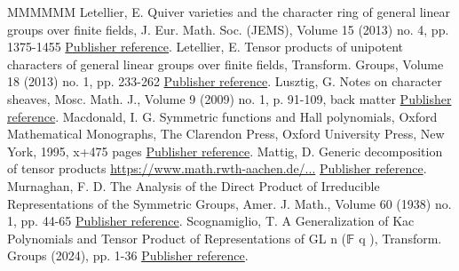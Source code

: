 \documentclass[11pt]{article}
\theoremstyle{definition}
\numberwithin{equation}{section}
\begin{document}
\begin{thebibliography}{MMMMMM}
 Letellier, E. Quiver varieties and the character ring of general linear groups over finite fields, J. Eur. Math. Soc. (JEMS), Volume 15 (2013) no. 4, pp. 1375-1455 \href{https://alco.centre-mersenne.org/articles/10.5802/alco.434/#L2}{Publisher reference}.
 Letellier, E. Tensor products of unipotent characters of general linear groups over finite fields, Transform. Groups, Volume 18 (2013) no. 1, pp. 233-262 \href{https://alco.centre-mersenne.org/articles/10.5802/alco.434/#L1}{Publisher reference}.
 Lusztig, G. Notes on character sheaves, Mosc. Math. J., Volume 9 (2009) no. 1, p. 91-109, back matter \href{https://alco.centre-mersenne.org/articles/10.5802/alco.434/#Lu1}{Publisher reference}.
 Macdonald, I. G. Symmetric functions and Hall polynomials, Oxford Mathematical Monographs, The Clarendon Press, Oxford University Press, New York, 1995, x+475 pages \href{https://alco.centre-mersenne.org/articles/10.5802/alco.434/#macdonald}{Publisher reference}.
 Mattig, D. Generic decomposition of tensor products \url{https://www.math.rwth-aachen.de/...} \href{https://alco.centre-mersenne.org/articles/10.5802/alco.434/#Lu}{Publisher reference}.
 Murnaghan, F. D. The Analysis of the Direct Product of Irreducible Representations of the Symmetric Groups, Amer. J. Math., Volume 60 (1938) no. 1, pp. 44-65 \href{https://alco.centre-mersenne.org/articles/10.5802/alco.434/#Mu}{Publisher reference}.
 Scognamiglio, T. A Generalization of Kac Polynomials and Tensor Product of Representations of GL n (𝔽 q ), Transform. Groups (2024), pp. 1-36 \href{https://alco.centre-mersenne.org/articles/10.5802/alco.434/#S}{Publisher reference}.
\end{thebibliography}
\end{document}
